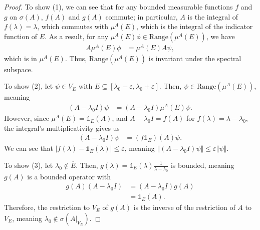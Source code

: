 \documentclass[12pt]{extarticle}
\newcommand{\norm}[1]{\left\Vert #1\right\Vert}
\theoremstyle{plain}
\theoremstyle{definition}
\theoremstyle{remark}
\renewcommand{\newline}{\hfill\break}
\begin{document}
  \begin{proof}
    To show (1), we can see that for any bounded measurable functions $f$ and $g$ on $\sigma(A)$, $f(A)$ and $g(A)$ commute; in particular, $A$ is the integral of $f(\lambda) = \lambda$, which commutes with $\mu^{A}(E)$, which is the integral of the indicator function of $E$. As a result, for any $\mu^{A}(E)\phi \in \text{Range}\left(\mu^{A}(E)\right)$, we have
    \begin{align*}
      A\mu^{A}(E)\phi &= \mu^{A}(E)A\psi,
    \end{align*}
    which is in $\mu^{A}(E)$. Thus, $\text{Range}\left(\mu^{A}(E)\right)$ is invariant under the spectral subspace.\newline

    To show (2), let $\psi \in V_E$ with $E \subseteq [\lambda_0 - \varepsilon,\lambda_0 + \varepsilon]$. Then, $\psi\in \text{Range}\left(\mu^{A}(E)\right)$, meaning
    \begin{align*}
      (A - \lambda_0 I)\psi &= (A - \lambda_0 I)\mu^{A}(E)\psi.
    \end{align*}
    However, since $\mu^{A}(E) = \mathbb{1}_{E}(A)$, and $A - \lambda_0 I = f(A)$ for $f(\lambda) = \lambda - \lambda_0$, the integral's multiplicativity gives us
    \begin{align*}
      (A - \lambda_0 I)\psi &= \left(f\mathbb{1}_{E}\right)(A)\psi.
    \end{align*}
    We can see that $\left\vert f(\lambda) - \mathbb{1}_{E}(\lambda) \right\vert \leq \varepsilon$, meaning $\norm{(A - \lambda_0 I)\psi} \leq \varepsilon \norm{\psi}$.\newline

    To show (3), let $\lambda_0 \notin \overline{E}$. Then, $g(\lambda) = \mathbb{1}_{E}(\lambda)\frac{1}{\lambda - \lambda_0}$ is bounded, meaning $g(A)$ is a bounded operator with
    \begin{align*}
      g(A)\left(A - \lambda_0 I\right) &= (A - \lambda_0 I)g(A)\\
                                       &= \mathbb{1}_{E}(A).
    \end{align*}
    Therefore, the restriction to $V_E$ of $g(A)$ is the inverse of the restriction of $A$ to $V_E$, meaning $\lambda_0\notin \sigma\left(A\rvert_{V_E}\right)$.\newline


\end{proof}
\end{document}
